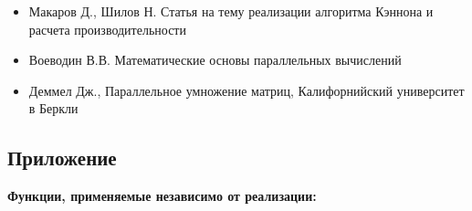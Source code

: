 \documentclass[12pt]{article}
\begin{document}
\begin{itemize}
    \item Макаров Д., Шилов Н. Статья на тему реализации алгоритма Кэннона и расчета производительности
    \item Воеводин В.В. Математические основы параллельных вычислений
    \item Деммел Дж., Параллельное умножение матриц, Калифорнийский университет в Беркли
\end{itemize}
\newpage
\begin{center}
    \section{Приложение}
\end{center}

\textbf{Функции, применяемые независимо от реализации:}
\end{document}
